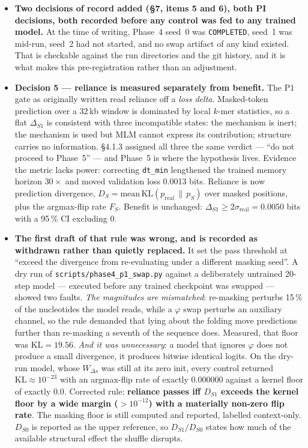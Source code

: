 \documentclass[11pt,a4paper]{article}
\newcommand{\code}[1]{\texttt{\small #1}}
\begin{document}
\begin{itemize}
\item \textbf{Two decisions of record added (\S7, items 5 and 6), both PI
decisions, both recorded before any control was fed to any trained model.} At
the time of writing, Phase~4 seed~0 was \code{COMPLETED}, seed~1 was mid-run,
seed~2 had not started, and no swap artifact of any kind existed. That is
checkable against the run directories and the git history, and it is what makes
this pre-registration rather than an adjustment.

\item \textbf{Decision 5 --- reliance is measured separately from benefit.} The
P1 gate as originally written read reliance off a \emph{loss delta}. Masked-token
prediction over a 32\,kb window is dominated by local $k$-mer statistics, so a
flat $\Delta_{S1}$ is consistent with three incompatible states: the mechanism is
inert; the mechanism is used but MLM cannot express its contribution; structure
carries no information. \S4.1.3 assigned all three the same verdict --- ``do not
proceed to Phase~5'' --- and Phase~5 is where the hypothesis lives. Evidence the
metric lacks power: correcting \code{dt\_min} lengthened the trained memory
horizon $30\times$ and moved validation loss 0.0013 bits. Reliance is now
prediction divergence, $D_S = \mathrm{mean}\,\mathrm{KL}(p_{\mathrm{real}} \,\|\,
p_S)$ over masked positions, plus the argmax-flip rate $F_S$. Benefit is
unchanged: $\Delta_{S1} \ge 2\sigma_{\mathrm{real}} = 0.0050$ bits with a 95\,\%
CI excluding 0.

\item \textbf{The first draft of that rule was wrong, and is recorded as
withdrawn rather than quietly replaced.} It set the pass threshold at ``exceed
the divergence from re-evaluating under a different masking seed''. A dry run of
\code{scripts/phase4\_p1\_swap.py} against a deliberately untrained 20-step model
--- executed before any trained checkpoint was swapped --- showed two faults.
\emph{The magnitudes are mismatched}: re-masking perturbs 15\,\% of the
nucleotides the model reads, while a $\varphi$ swap perturbs an auxiliary
channel, so the rule demanded that lying about the folding move predictions
further than re-masking a seventh of the sequence does. Measured, that floor was
$\mathrm{KL} = 19.56$. \emph{And it was unnecessary}: a model that ignores
$\varphi$ does not produce a small divergence, it produces bitwise identical
logits. On the dry-run model, whose $W_{\Delta s}$ was still at its zero init,
every control returned $\mathrm{KL} \approx 10^{-23}$ with an argmax-flip rate of
exactly $0.000000$ against a kernel floor of exactly $0.0$. Corrected rule:
\textbf{reliance passes iff $D_{S1}$ exceeds the kernel floor by a wide margin
($>10^{-12}$) with a materially non-zero flip rate}. The masking floor is still
computed and reported, labelled context-only. $D_{S0}$ is reported as the upper
reference, so $D_{S1}/D_{S0}$ states how much of the available structural effect
the shuffle disrupts.


\end{itemize}
\end{document}

